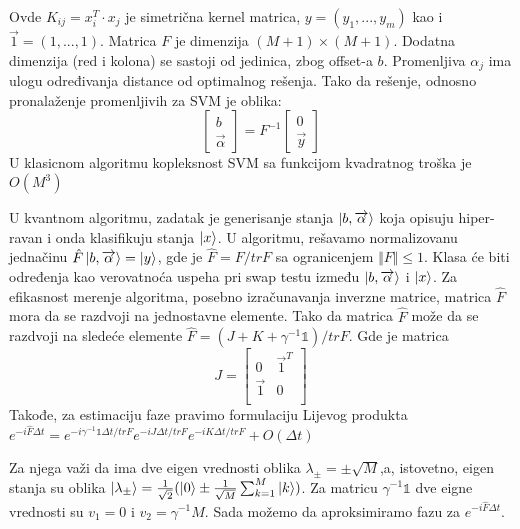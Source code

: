 \documentclass[12pt, letterpaper, oneside]{article}
\begin{document}
Ovde $K_{ij} = x_i^T \cdot x_j$ je simetrična kernel matrica, $y = (y_1,...,y_m)$ kao i
$\overrightarrow{1} = (1,...,1)$. Matrica $F$ je dimenzija $(M+1)\times(M+1)$. Dodatna dimenzija (red i kolona) se sastoji od jedinica,
zbog offset-a $b$. Promenljiva $\alpha_j$ ima ulogu određivanja distance od optimalnog rešenja. Tako da rešenje, odnosno pronalaženje promenljivih za SVM je oblika:
\[
    \begin{bmatrix}
        b \\
        \overrightarrow{\alpha}
    \end{bmatrix} =
    F^{-1} \begin{bmatrix}
        0 \\
        \overrightarrow{y}
    \end{bmatrix}
\]
U klasicnom algoritmu kopleksnost SVM sa funkcijom kvadratnog troška je $O(M^3)$ 

U kvantnom algoritmu, zadatak je generisanje stanja $\Ket{b,\overrightarrow{\alpha}}$ koja opisuju hiper-ravan i onda klasifikuju stanja
$\Ket{x}$. U algoritmu, rešavamo normalizovanu jednačinu $\hat{F}\Ket{b,\overrightarrow{\alpha}} = \Ket{y}$, gde je $\hat{F} = F/trF$ sa 
ogranicenjem $\Vert F \Vert \leq 1$. Klasa će biti određenja kao verovatnoća uspeha pri swap testu između $\Ket{b,\overrightarrow{\alpha}}$ i
$\Ket{x}$. Za efikasnost merenje algoritma, posebno izračunavanja inverzne matrice, matrica $\hat{F}$ mora da se razdvoji na jednostavne elemente.
Tako da matrica $\hat{F}$ može da se razdvoji na sledeće elemente $\hat{F} = (J+K+\gamma^{-1}\mathbb{1})/trF$. 
Gde je matrica
\[
    J = \begin{bmatrix}
        0 & \overrightarrow{1}^T \\
        \overrightarrow{1} & 0 \\
    \end{bmatrix}
\]
Takođe, za estimaciju faze pravimo formulaciju Lijevog produkta \\
$e^{-i\hat{F}\varDelta{t}} = e^{-i\gamma^{-1}\mathbb{1}\varDelta{t}/trF}e^{-iJ\varDelta{t}/trF}e^{-iK\varDelta{t}/trF} + O(\varDelta{t})$

Za njega važi da ima dve eigen vrednosti oblika $\lambda_{\pm} = \pm \sqrt{M}$,a, istovetno, 
eigen stanja su oblika $\Ket{\lambda_{\pm}} = \frac{1}{\sqrt{2}}(\Ket{0} \pm \frac{1}{\sqrt{M}}\sum_{k=1}^M\Ket{k})$.
Za matricu $\gamma^{-1}\mathbb{1}$ dve eigne vrednosti su $v_1 = 0$ i $v_2 = \gamma^{-1}M$.
Sada možemo da aproksimiramo fazu za $e^{-i\hat{F}\varDelta{t}}$.
\end{document}
